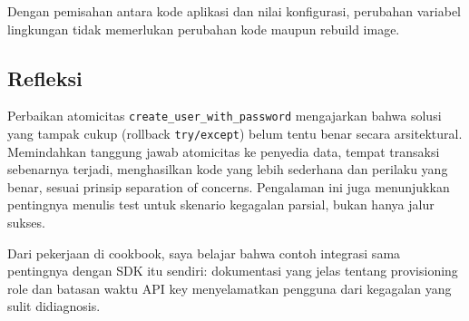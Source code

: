 Dengan pemisahan antara kode aplikasi dan nilai konfigurasi, perubahan variabel lingkungan tidak memerlukan perubahan kode maupun rebuild image.

\subsection{Refleksi}

Perbaikan atomicitas \texttt{create\_user\_with\_password} mengajarkan bahwa solusi yang tampak cukup (rollback \texttt{try/except}) belum tentu benar secara arsitektural. Memindahkan tanggung jawab atomicitas ke penyedia data, tempat transaksi sebenarnya terjadi, menghasilkan kode yang lebih sederhana dan perilaku yang benar, sesuai prinsip separation of concerns. Pengalaman ini juga menunjukkan pentingnya menulis test untuk skenario kegagalan parsial, bukan hanya jalur sukses.

Dari pekerjaan di cookbook, saya belajar bahwa contoh integrasi sama pentingnya dengan SDK itu sendiri: dokumentasi yang jelas tentang provisioning role dan batasan waktu API key menyelamatkan pengguna dari kegagalan yang sulit didiagnosis.

\clearpage
